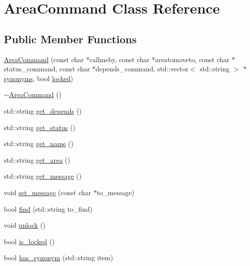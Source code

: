 \hypertarget{class_area_command}{
\section{\-Area\-Command \-Class \-Reference}
\label{class_area_command}
}
\subsection*{\-Public \-Member \-Functions}
\begin{DoxyCompactItemize}
\item 
\hyperlink{class_area_command_a638e3a777d9c8e3810212835b979eff0}{\-Area\-Command} (const char $\ast$callmeby, const char $\ast$areatomoveto, const char $\ast$status\-\_\-command, const char $\ast$depends\-\_\-command, std\-::vector$<$ std\-::string $>$ $\ast$\hyperlink{class_area_command_a2d89a68dd223fefde961b443caec9153}{synonyms}, bool \hyperlink{class_area_command_a23a6e53dfc6f1d8988f41b9fc48c3048}{locked})
\item 
\hyperlink{class_area_command_aa978468c6b9bcc165d70437273623950}{$\sim$\-Area\-Command} ()
\item 
std\-::string \hyperlink{class_area_command_a7c24cd88b6913494bfed3b6f6b0fe7f6}{get\-\_\-depends} ()
\item 
std\-::string \hyperlink{class_area_command_adc3423bc66eba73317cd941632026b85}{get\-\_\-status} ()
\item 
std\-::string \hyperlink{class_area_command_ad61a6fb1db17d07a2e214c7c2267581d}{get\-\_\-name} ()
\item 
std\-::string \hyperlink{class_area_command_a9f558f5ce36040a51401924af9781402}{get\-\_\-area} ()
\item 
std\-::string \hyperlink{class_area_command_a594ec5125fc0467ee001064ff73a1632}{get\-\_\-message} ()
\item 
void \hyperlink{class_area_command_a1a081291614ee6ff8c5841d2753b3b1b}{set\-\_\-message} (const char $\ast$to\-\_\-message)
\item 
bool \hyperlink{class_area_command_a317a22131f031bbc4f364b1199261829}{find} (std\-::string to\-\_\-find)
\item 
void \hyperlink{class_area_command_a0a5c63d57a821d2f3d833e7a826afa4a}{unlock} ()
\item 
bool \hyperlink{class_area_command_a34eba7b250e50210e2da7faf07754ff6}{is\-\_\-locked} ()
\item 
bool \hyperlink{class_area_command_ab5fef6aab4c7efd6767eacafc1994e96}{has\-\_\-synonym} (std\-::string item)
\end{DoxyCompactItemize}
